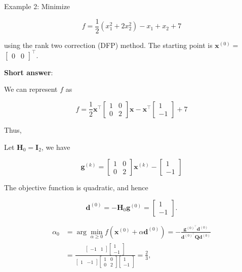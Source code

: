 \medskip

Example 2: Minimize

\[
	f=\frac{1}{2}\left(x_{1}^{2}+2 x_{2}^{2}\right)-x_{1}+x_{2}+7
\]

using the rank two correction (DFP) method. The starting point is \(\boldsymbol{x}^{(0)}=\) \(\left[\begin{array}{ll}0 & 0\end{array}\right]^{\top}\).

\textbf{Short answer}:

We can represent \(f\) as

\[
	f=\frac{1}{2} \boldsymbol{x}^{\top}\left[\begin{array}{ll}
		1 & 0 \\
		0 & 2
	\end{array}\right] \boldsymbol{x}-\boldsymbol{x}^{\top}\left[\begin{array}{c}
		1 \\
		-1
	\end{array}\right]+7
\]

Thus,

Let \(\boldsymbol{H}_{0}=\boldsymbol{I}_{2}\), we have

\[
	\boldsymbol{g}^{(k)}=\left[\begin{array}{ll}
		1 & 0 \\
		0 & 2
	\end{array}\right] \boldsymbol{x}^{(k)}-\left[\begin{array}{c}
		1 \\
		-1
	\end{array}\right]
\]

The objective function is quadratic, and hence

\[
	\boldsymbol{d}^{(0)}=-\boldsymbol{H}_{0} \boldsymbol{g}^{(0)}=\left[\begin{array}{c}
		1 \\
		-1
	\end{array}\right] .
\]

\[
	\begin{aligned}
		\alpha_{0} & =\arg \min _{\alpha \geq 0} f\left(\boldsymbol{x}^{(0)}+\alpha \boldsymbol{d}^{(0)}\right)=-\frac{\boldsymbol{g}^{(0)^{\top}} \boldsymbol{d}^{(0)}}{\boldsymbol{d}^{(0)^{\top}} \boldsymbol{Q} \boldsymbol{d}^{(0)}} \\
		& =\frac{\left[\begin{array}{ll}
				-1 & 1
			\end{array}\right]\left[\begin{array}{c}
				1 \\
				-1
			\end{array}\right]}{\left[\begin{array}{ll}
				1 & -1
			\end{array}\right]\left[\begin{array}{ll}
				1 & 0 \\
				0 & 2
			\end{array}\right]\left[\begin{array}{c}
				1 \\
				-1
			\end{array}\right]}=\frac{2}{3},
	\end{aligned}
\]

